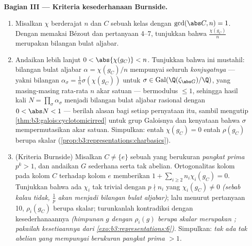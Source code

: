 \begin{problem}
\medskip
\noindent\textbf{Bagian III --- Kriteria kesederhanaan Burnside.}
\begin{enumerate}[resume]
  \item Misalkan $\chi$  berderajat $n$ dan $C$ sebuah kelas
        dengan $\gcd(\abs C, n) = 1$. Dengan memakai Bézout dan pertanyaan
        4--7, tunjukkan bahwa $\frac{\chi(g_C)}{n}$ merupakan bilangan bulat
        aljabar.
  \item Andaikan lebih lanjut $0 < \abs{\chi(g_C)} < n$. Tunjukkan bahwa ini
        mustahil: bilangan bulat aljabar $\alpha =
        \chi(g_C)/n$ mempunyai seluruh \emph{konjugatnya} --- yakni
        bilangan $\alpha_\sigma = \frac1n\sigma(\chi(g_C))$ untuk
        $\sigma \in \operatorname{Gal}(\Q(\zeta_{\abs G})/\Q)$,
        yang masing-masing rata-rata $n$ akar satuan --- bermodulus
        $\leq 1$,
        sehingga hasil kali $N = \prod_\sigma\alpha_\sigma$ menjadi
        bilangan bulat aljabar rasional dengan $0 < \abs N < 1$ ---
        berilah alasan bagi setiap pernyataan itu, sambil mengutip
        \cref{thm:b3:galois:cyclotomicirred} untuk grup Galoisnya
        dan kenyataan bahwa $\sigma$ mempermutasikan akar
        satuan. Simpulkan: entah $\chi(g_C) = 0$ entah $\rho(g_C)$
        berupa skalar (\cref{prop:b3:representations:charbasics}).
  \item (Kriteria Burnside) Misalkan $C \neq \{e\}$ sebuah
         yang berukuran \emph{pangkat prima} $p^k > 1$,
        dan andaikan $G$ sederhana serta tak abelian. Ortogonalitas
        kolom pada kolom $C$ terhadap kolom
        $e$ memberikan $1 + \sum_{i \geq 2} n_i\chi_i(g_C) = 0$. Tunjukkan
        bahwa ada $\chi_i$ tak trivial dengan $p \nmid n_i$ yang
        $\chi_i(g_C) \neq 0$ \emph{(sebab kalau tidak, $\frac1p$ akan menjadi
        bilangan bulat aljabar)}; lalu menurut pertanyaan 10, $\rho_i(g_C)$
        berupa skalar; turunkanlah kontradiksi dengan kesederhanaannya
        \emph{(himpunan $g$ dengan $\rho_i(g)$ berupa skalar merupakan
        ; pakailah kesetiaannya dari
        \cref{exo:b3:representations:6})}. Simpulkan: \emph{tak ada
         tak abelian yang mempunyai  berukuran pangkat
        prima $> 1$.}
\end{enumerate}


\end{problem}
